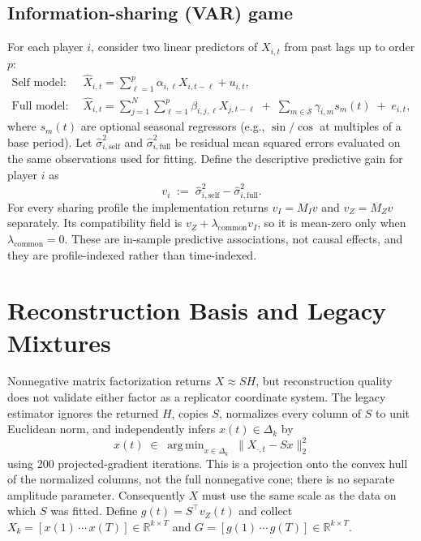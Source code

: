 \documentclass[11pt]{article}
\newcommand{\R}{\mathbb{R}}
\DeclareMathOperator*{\argmin}{arg\,min}
\begin{document}
\subsection{Information-sharing (VAR) game}
For each player $i$, consider two linear predictors of $X_{i,t}$ from past lags up to order $p$:
\begin{align}
\text{Self model: }\quad & \hat X_{i,t} = \sum_{\ell=1}^p \alpha_{i,\ell} X_{i,t-\ell} + u_{i,t},\\
\text{Full model: }\quad & \hat X_{i,t} = \sum_{j=1}^N \sum_{\ell=1}^p \beta_{i,j,\ell} X_{j,t-\ell} \;+\; \sum_{m\in\mathcal{S}} \gamma_{i,m} s_m(t) \;+\; e_{i,t},
\end{align}
where $s_m(t)$ are optional seasonal regressors (e.g., $\sin/\cos$ at multiples of a base period). Let $\widehat\sigma^2_{i,\mathrm{self}}$ and $\widehat\sigma^2_{i,\mathrm{full}}$ be residual mean squared errors evaluated on the same observations used for fitting. Define the descriptive predictive gain for player $i$ as
\begin{equation}
v_i \;:=\; \widehat\sigma^2_{i,\mathrm{self}} - \widehat\sigma^2_{i,\mathrm{full}}.
\end{equation}
For every sharing profile the implementation returns $v_I=M_Iv$ and
$v_Z=M_Zv$ separately. Its compatibility field is
$v_Z+\lambda_{\mathrm{common}}v_I$, so it is mean-zero only when
$\lambda_{\mathrm{common}}=0$. These are in-sample predictive associations, not
causal effects, and they are profile-indexed rather than time-indexed.

\section{Reconstruction Basis and Legacy Mixtures}
Nonnegative matrix factorization returns $X\approx SH$, but reconstruction
quality does not validate either factor as a replicator coordinate system. The
legacy estimator ignores the returned $H$, copies $S$, normalizes every column
of $S$ to unit Euclidean norm, and independently infers $x(t)\in\Delta_k$ by
\begin{equation}
x(t)\;\in\;\argmin_{x\in\Delta_k}\;\|X_{\cdot,t}-Sx\|_2^2
\end{equation}
using 200 projected-gradient iterations. This is a projection onto the convex
hull of the normalized columns, not the full nonnegative cone; there is no
separate amplitude parameter. Consequently $X$ must use the same scale as the
data on which $S$ was fitted. Define $g(t)=S^\top v_Z(t)$ and collect
$X_k=[x(1)\,\cdots\,x(T)]\in\R^{k\times T}$ and
$G=[g(1)\,\cdots\,g(T)]\in\R^{k\times T}$.
\end{document}
